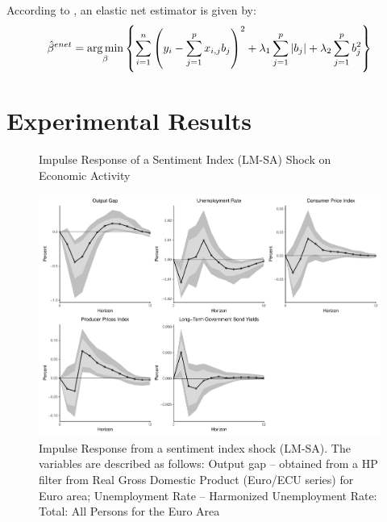According to \cite{zou2005regularization}, an elastic net estimator is given by:
\begin{align}\label{eq:elasticnet}
    \hat{\beta}^{enet} = \operatorname*{arg\,min}_{\beta} \left\{ \sum_{i=1}^{n} \left( y_i - \sum_{j=1}^p x_{i,j}b_j \right)^2 + \lambda_1 \sum_{j=1}^p |b_j| + \lambda_2 \sum_{j=1}^p b_j^2 \right\}
\end{align}





\section{Experimental Results}




\begin{figure}
    \centering
    \caption{Impulse Response of a Sentiment Index (LM-SA) Shock on Economic Activity}
    \includegraphics[width=\textwidth]{images/irf_lm.pdf}
    \caption*{Impulse Response from a sentiment index shock (LM-SA). The variables are described as follows: Output gap -- obtained from a HP filter from Real Gross Domestic Product (Euro/ECU series) for Euro area; Unemployment Rate -- Harmonized Unemployment Rate: Total: All Persons for the Euro Area}
    \label{fig:irflm}
\end{figure}


